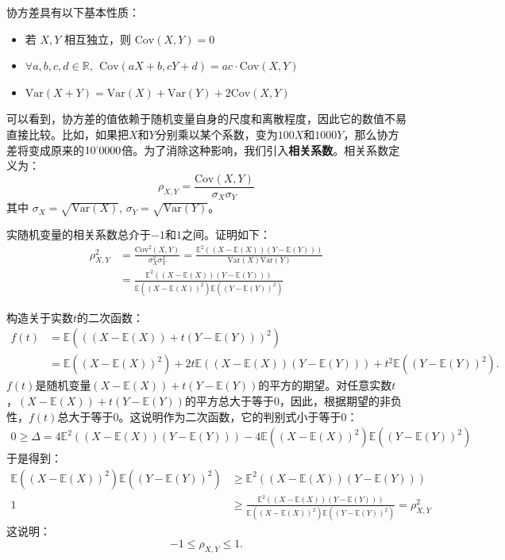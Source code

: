\documentclass[12pt,UTF8,fontset=none]{ctexbook}
\begin{document}
协方差具有以下基本性质：
\begin{itemize}
    \item 若 \(X,Y\) 相互独立，则 \(\text{Cov}(X,Y) = 0\)
    \item \(\forall a,b,c,d \in \mathbb{R}, \;\,\text{Cov}(aX+b,cY+d) = ac\cdot\text{Cov}(X,Y)\)
    \item \(\text{Var}(X+Y) = \text{Var}(X) + \text{Var}(Y) + 2\text{Cov}(X,Y)\)
\end{itemize}

可以看到，协方差的值依赖于随机变量自身的尺度和离散程度，因此它的数值不易直接比较。比如，如果把$X$和$Y$分别乘以某个系数，变为$100X$和$1000Y$，那么协方差将变成原来的$10\dlim{0000}$倍。为了消除这种影响，我们引入\textbf{相关系数}。相关系数定义为：
\[
\rho_{X,Y} = \frac{\text{Cov}(X,Y)}{\sigma_X \sigma_Y}
\]
其中 \(\sigma_X = \sqrt{\text{Var}(X)}\), \(\sigma_Y = \sqrt{\text{Var}(Y)}\)。

实随机变量的相关系数总介于$-1$和$1$之间。证明如下：
\begin{align*}
    \rho^2_{X,Y} &= \frac{\text{Cov}^2(X,Y)}{\sigma_X^2 \sigma_Y^2} = \frac{\mathbb{E}^2((X - \mathbb{E}(X))(Y - \mathbb{E}(Y)))}{\text{Var}(X)\text{Var}(Y)} \\[2ex]
    &= \frac{\mathbb{E}^2((X - \mathbb{E}(X))(Y - \mathbb{E}(Y)))}{\mathbb{E}((X - \mathbb{E}(X))^2)\mathbb{E}((Y - \mathbb{E}(Y))^2)} 
\end{align*}

构造关于实数$t$的二次函数：
\begin{align*}
    f(t) &= \mathbb{E}(((X - \mathbb{E}(X)) + t(Y - \mathbb{E}(Y)))^2) \\
    &= \mathbb{E}((X - \mathbb{E}(X))^2) + 2t\mathbb{E}((X - \mathbb{E}(X))(Y - \mathbb{E}(Y))) + t^2\mathbb{E}((Y - \mathbb{E}(Y))^2).
\end{align*}
$f(t)$是随机变量$(X - \mathbb{E}(X)) + t(Y - \mathbb{E}(Y))$的平方的期望。对任意实数$t$，$(X - \mathbb{E}(X)) + t(Y - \mathbb{E}(Y))$的平方总大于等于$0$，因此，根据期望的非负性，$f(t)$总大于等于$0$。这说明作为二次函数，它的判别式小于等于$0$：
\begin{align*}
    0 \geqslant 
    \Delta = 4\mathbb{E}^2((X - \mathbb{E}(X))(Y - \mathbb{E}(Y))) - 4\mathbb{E}((X - \mathbb{E}(X))^2)\mathbb{E}((Y - \mathbb{E}(Y))^2) 
\end{align*}
于是得到：
\begin{align*}
    \mathbb{E}((X - \mathbb{E}(X))^2)\mathbb{E}((Y - \mathbb{E}(Y))^2) &\geqslant \mathbb{E}^2((X - \mathbb{E}(X))(Y - \mathbb{E}(Y))) \\[2ex]
    1 &\geqslant \frac{\mathbb{E}^2((X - \mathbb{E}(X))(Y - \mathbb{E}(Y)))}{\mathbb{E}((X - \mathbb{E}(X))^2)\mathbb{E}((Y - \mathbb{E}(Y))^2)} = \rho^2_{X,Y} 
\end{align*}
这说明：
$$ -1 \leqslant \rho_{X,Y} \leqslant 1.$$
\end{document}

